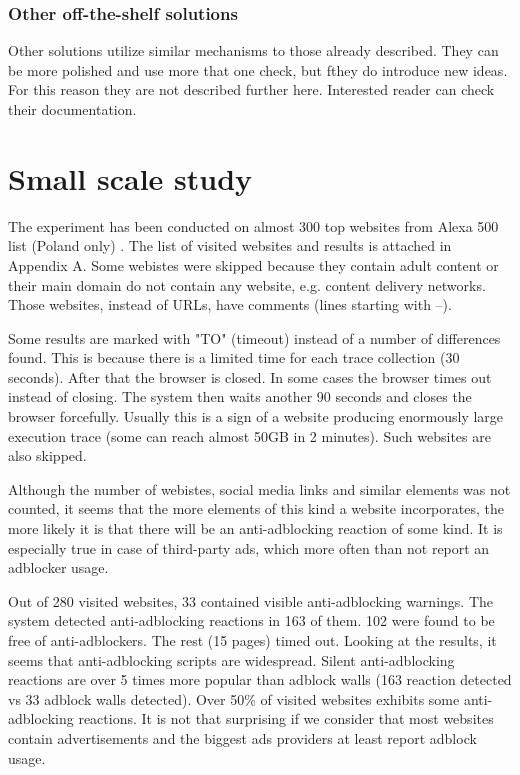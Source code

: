 \subsubsection{Other off-the-shelf solutions}
Other solutions utilize similar mechanisms to those already described.
They can be more polished and use more that one check,
but fthey do introduce new ideas. For this reason they are not described further here.
Interested reader can check their documentation.


\section{Small scale study}

The experiment has been conducted on almost 300 top websites from Alexa 500 list (Poland only) \cite{alexa-list}.
The list of visited websites and results is attached in Appendix A. Some webistes were skipped because they
contain adult content or their main domain do not contain any website, e.g. content delivery networks. 
Those websites, instead of URLs, have comments (lines starting with --).

Some results are marked with "TO" (timeout) instead of a number of differences found. This is because
there is a limited time for each trace collection (30 seconds). After that the browser is closed.
In some cases the browser times out instead of closing. The system then waits another 90 seconds and closes
the browser forcefully.
Usually this is a sign of a website producing enormously large execution trace
(some can reach almost 50GB in 2 minutes).
Such websites are also skipped.

Although the number of webistes, social media links and similar elements was not counted, it seems that the more 
elements of this kind a website incorporates, the more likely it is that there will be an anti-adblocking reaction of some kind.
It is especially true in case of third-party ads, which more often than not report an adblocker usage.

Out of 280 visited websites, 33 contained visible anti-adblocking warnings. 
The system detected anti-adblocking reactions in 163 of them. 102 were found to be free of anti-adblockers.
The rest (15 pages) timed out.
Looking at the results, it seems that anti-adblocking scripts are widespread. 
Silent anti-adblocking reactions are over 5 times more popular than adblock walls
(163 reaction detected vs 33 adblock walls detected). Over 50\% of visited websites exhibits some 
anti-adblocking reactions. It is not that surprising if we consider that most websites contain advertisements
and the biggest ads providers at least report adblock usage.


